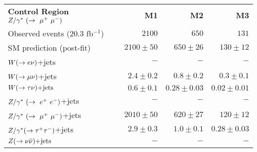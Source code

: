 \begin{table}[!ht]
\begin{center}
\begin{small}
\begin{tabular*}{\textwidth}{@{\extracolsep{\fill}}lrrr}\hline
{\bf Control Region} $Z/\gamma^*~(\rightarrow~\mu^+~\mu^-)$  & \textbf{M1} & \textbf{M2} & \textbf{M3}  \\
    Observed events  (20.3 fb${}^{-1}$)& $2100$        & $650$          & $131$            \\ \hline
                                                                                         
    SM prediction (post-fit)                     & $2100 \pm 50$ & $650 \pm 26$   & $130 \pm 12$     \\ \hline
                                                                                         
    $W(\rightarrow e \nu)$+jets                             & $-$           & $-$            & $-$              \\
                                                                                         
    $W(\rightarrow \mu \nu)$+jets                             & $2.4 \pm 0.2$ & $0.8 \pm 0.2$  & $0.3 \pm 0.1$     \\
                                                                                         
    $W(\rightarrow \tau \nu)\text{+jets}$                             & $0.6 \pm 0.1$ & $0.28 \pm 0.03$& $0.02 \pm 0.01$  \\
                                                                                         
    $Z/\gamma^*~(\rightarrow~e^+~e^-)$+jets                             & $-$           & $-$            & $-$              \\
                                                                                         
    $Z/\gamma^*~(\rightarrow~\mu^+~\mu^-)$+jets                             & $2010 \pm 50$ & $620 \pm 27$   & $120 \pm 12$   \\
                                                                                         
    $Z/\gamma^*(\rightarrow \tau^+ \tau^-)$+jets                             & $2.9 \pm 0.3$ & $1.0 \pm 0.1$  & $0.28 \pm 0.03$\\
                                                                                         
    $Z(\rightarrow \nu \bar{\nu})\text{+jets}$                             & $-$           & $-$            & $-$              \\
                                                                                         

\end{tabular*}
\end{small}
\end{center}
\end{table}
